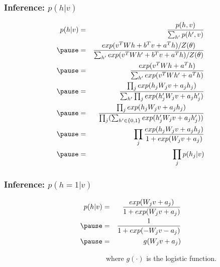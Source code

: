 \documentclass{beamer}
\begin{document}

\begin{frame}
\frametitle{Inference: $p(h|v)$}

\begin{eqnarray}
p(h|v) & = & \frac{p(h, v)}{\sum_{h'}p(h', v)} \\ \pause 
& = & \frac{exp(v^TWh+b^Tv+a^Th)/Z(\theta)}{\sum_{h'}exp(v^TWh'+b^Tv+a^Th)/Z(\theta)} \\ \pause 
& = & \frac{exp(v^TWh+a^Th)}{\sum_{h'}exp(v^TWh'+a^Th)} \\ \pause 
& = & \frac{\prod_{j}exp(h_jW_jv+a_jh_j)}{\sum_{h'}\prod_{j}exp(h'_jW_jv+a_jh'_j)}\\ \pause 
& = & \frac{\prod_{j}exp(h_jW_jv+a_jh_j)}{\prod_{j} (\sum_{h' \in \{0, 1\}}exp(h'_jW_jv+a_jh'_j))}\\ \pause 
& = & \prod_j \frac{exp(h_jW_jv+a_jh_j)}{1+exp(W_jv+a_j)} \\ \pause 
& = & \prod_j p(h_j|v)
\end{eqnarray}

\end{frame}


\begin{frame}
\frametitle{Inference: $p(h=1|v)$}

\begin{eqnarray}
p(h|v) & = & \frac{exp(W_jv+a_j)}{1+exp(W_jv+a_j)} \\ \pause
& = & \frac{1}{1+exp(-W_jv-a_j)} \\ \pause
& = & g(W_jv+a_j) 
\end{eqnarray}

\noindent \ \ \ \ \ \ \ \ \ \ \ \ \ \ \ \ \ \ \ \ \ \ \ \ \ \ \ \ \  where $g(\cdot)$ is the logistic function.

\end{frame}

\end{document}
